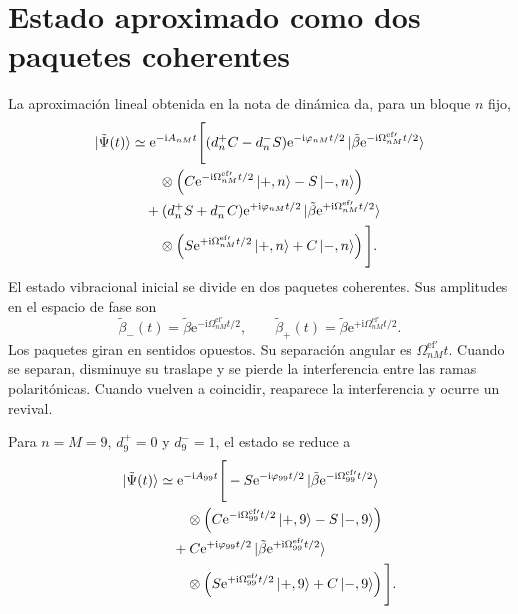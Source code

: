 \documentclass[11pt]{article}
\newcommand{\ii}{\mathrm{i}}
\newcommand{\ee}{\mathrm{e}}
\begin{document}
\section{Estado aproximado como dos paquetes coherentes}

La aproximaci\'on lineal obtenida en la nota de din\'amica da, para un bloque
$n$ fijo,
\begin{align}
  \ket{\tilde\Psi(t)}
  &\simeq
  \ee^{-\ii A_{nM}t}
  \Bigg[
  (d_n^+C-d_n^-S)
  \ee^{-\ii\varphi_{nM}t/2}
  \ket{\tilde\beta\ee^{-\ii\Omega_{nM}^{\mathrm{ef}\prime}t/2}}
  \notag\\
  &\qquad\otimes
  \left(
  C\ee^{-\ii\Omega_{nM}^{\mathrm{ef}\prime}t/2}\ket{+,n}
  -S\ket{-,n}
  \right)
  \notag\\
  &\quad+
  (d_n^+S+d_n^-C)
  \ee^{+\ii\varphi_{nM}t/2}
  \ket{\tilde\beta\ee^{+\ii\Omega_{nM}^{\mathrm{ef}\prime}t/2}}
  \notag\\
  &\qquad\otimes
  \left(
  S\ee^{+\ii\Omega_{nM}^{\mathrm{ef}\prime}t/2}\ket{+,n}
  +C\ket{-,n}
  \right)
  \Bigg].
\end{align}
El estado vibracional inicial se divide en dos paquetes coherentes. Sus
amplitudes en el espacio de fase son
\begin{equation}
  \tilde\beta_-(t)
  =
  \tilde\beta\ee^{-\ii\Omega_{nM}^{\mathrm{ef}\prime}t/2},
  \qquad
  \tilde\beta_+(t)
  =
  \tilde\beta\ee^{+\ii\Omega_{nM}^{\mathrm{ef}\prime}t/2}.
\end{equation}
Los paquetes giran en sentidos opuestos. Su separaci\'on angular es
$\Omega_{nM}^{\mathrm{ef}\prime}t$. Cuando se separan, disminuye su traslape y
se pierde la interferencia entre las ramas polarit\'onicas. Cuando vuelven a
coincidir, reaparece la interferencia y ocurre un revival.

Para $n=M=9$, $d_9^+=0$ y $d_9^-=1$, el estado se reduce a
\begin{align}
  \ket{\tilde\Psi(t)}
  &\simeq
  \ee^{-\ii A_{99}t}
  \Bigg[
  -S\ee^{-\ii\varphi_{99}t/2}
  \ket{\tilde\beta\ee^{-\ii\Omega_{99}^{\mathrm{ef}\prime}t/2}}
  \notag\\
  &\qquad\otimes
  \left(
  C\ee^{-\ii\Omega_{99}^{\mathrm{ef}\prime}t/2}\ket{+,9}
  -S\ket{-,9}
  \right)
  \notag\\
  &\quad+
  C\ee^{+\ii\varphi_{99}t/2}
  \ket{\tilde\beta\ee^{+\ii\Omega_{99}^{\mathrm{ef}\prime}t/2}}
  \notag\\
  &\qquad\otimes
  \left(
  S\ee^{+\ii\Omega_{99}^{\mathrm{ef}\prime}t/2}\ket{+,9}
  +C\ket{-,9}
  \right)
  \Bigg].
\end{align}
\end{document}
